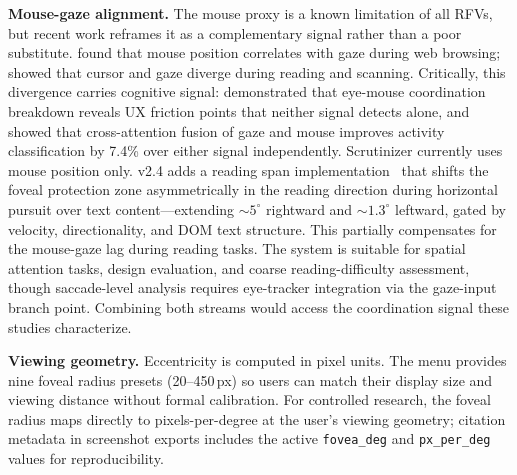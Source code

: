 \documentclass[10pt,twocolumn,letterpaper]{article}
\begin{document}
\textbf{Mouse-gaze alignment.} The mouse proxy is a known limitation of all RFVs, but recent work reframes it as a complementary signal rather than a poor substitute. \citet{chen2001} found that mouse position correlates with gaze during web browsing; \citet{huang2012} showed that cursor and gaze diverge during reading and scanning. Critically, this divergence carries cognitive signal: \citet{stone2023} demonstrated that eye-mouse coordination breakdown reveals UX friction points that neither signal detects alone, and \citet{zhu2023} showed that cross-attention fusion of gaze and mouse improves activity classification by 7.4\% over either signal independently. Scrutinizer currently uses mouse position only. v2.4 adds a reading span implementation~\citep{rayner1998} that shifts the foveal protection zone asymmetrically in the reading direction during horizontal pursuit over text content---extending ${\sim}5^{\circ}$ rightward and ${\sim}1.3^{\circ}$ leftward, gated by velocity, directionality, and DOM text structure. This partially compensates for the mouse-gaze lag during reading tasks. The system is suitable for spatial attention tasks, design evaluation, and coarse reading-difficulty assessment, though saccade-level analysis requires eye-tracker integration via the gaze-input branch point. Combining both streams would access the coordination signal these studies characterize.

\textbf{Viewing geometry.} Eccentricity is computed in pixel units. The menu provides nine foveal radius presets (20--450\,px) so users can match their display size and viewing distance without formal calibration. For controlled research, the foveal radius maps directly to pixels-per-degree at the user's viewing geometry; citation metadata in screenshot exports includes the active \texttt{fovea\_deg} and \texttt{px\_per\_deg} values for reproducibility.
\end{document}
